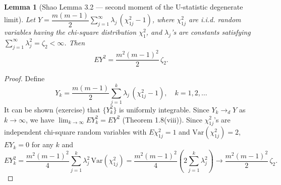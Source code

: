 \documentclass{article}
\newtheorem{lemma}{Lemma}[section]
\begin{document}
\begin{lemma}[Shao Lemma 3.2 — second moment of the U-statistic degenerate limit]
\label{lem:shao_3_2}
Let $Y = \dfrac{m(m-1)}{2} \sum_{j=1}^{\infty} \lambda_j \, (\chi_{1j}^2 - 1)$,
where $\chi_{1j}^2$ are i.i.d. random variables having the chi-square distribution
$\chi_1^2$, and $\lambda_j$'s are constants satisfying
$\sum_{j=1}^{\infty} \lambda_j^2 = \zeta_2 < \infty$. Then
\[
E Y^2 = \frac{m^2 (m-1)^2}{2}\, \zeta_2 .
\]
\end{lemma}

\begin{proof}
Define
\[
Y_k = \frac{m(m-1)}{2} \sum_{j=1}^{k} \lambda_j \, (\chi_{1j}^2 - 1), \quad k = 1, 2, \dots
\]
It can be shown (exercise) that $\{Y_k^2\}$ is uniformly integrable. Since
$Y_k \to_d Y$ as $k \to \infty$, we have $\lim_{k \to \infty} E Y_k^2 = E Y^2$
(Theorem 1.8(viii)). Since $\chi_{1j}^2$'s are independent chi-square random
variables with $E \chi_{1j}^2 = 1$ and $\mathrm{Var}(\chi_{1j}^2) = 2$,
$E Y_k = 0$ for any $k$ and
\[
E Y_k^2 = \frac{m^2 (m-1)^2}{4} \sum_{j=1}^{k} \lambda_j^2 \, \mathrm{Var}(\chi_{1j}^2)
       = \frac{m^2 (m-1)^2}{4} \left(2 \sum_{j=1}^{k} \lambda_j^2\right)
       \to \frac{m^2 (m-1)^2}{2}\, \zeta_2 .
\]
\end{proof}
\end{document}
